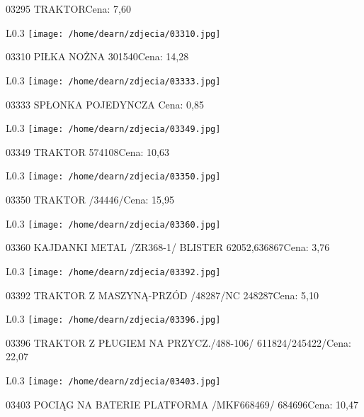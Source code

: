 03295 TRAKTORCena: 7,60\newline
\begin{wrapfigure}{L}{0.3\textwidth}
\texttt{[image: /home/dearn/zdjecia/03310.jpg]}
\end{wrapfigure}
03310 PIŁKA NOŻNA  301540Cena: 14,28\newline
\begin{wrapfigure}{L}{0.3\textwidth}
\texttt{[image: /home/dearn/zdjecia/03333.jpg]}
\end{wrapfigure}
03333 SPŁONKA POJEDYNCZA Cena: 0,85\newline
\begin{wrapfigure}{L}{0.3\textwidth}
\texttt{[image: /home/dearn/zdjecia/03349.jpg]}
\end{wrapfigure}
03349 TRAKTOR  574108Cena: 10,63\newline
\begin{wrapfigure}{L}{0.3\textwidth}
\texttt{[image: /home/dearn/zdjecia/03350.jpg]}
\end{wrapfigure}
03350 TRAKTOR /34446/Cena: 15,95\newline
\begin{wrapfigure}{L}{0.3\textwidth}
\texttt{[image: /home/dearn/zdjecia/03360.jpg]}
\end{wrapfigure}
03360 KAJDANKI METAL  /ZR368-1/  BLISTER        62052,636867Cena: 3,76\newline
\begin{wrapfigure}{L}{0.3\textwidth}
\texttt{[image: /home/dearn/zdjecia/03392.jpg]}
\end{wrapfigure}
03392 TRAKTOR Z MASZYNĄ-PRZÓD  /48287/NC              248287Cena: 5,10\newline
\begin{wrapfigure}{L}{0.3\textwidth}
\texttt{[image: /home/dearn/zdjecia/03396.jpg]}
\end{wrapfigure}
03396 TRAKTOR Z PŁUGIEM NA PRZYCZ./488-106/   611824/245422/Cena: 22,07\newline
\begin{wrapfigure}{L}{0.3\textwidth}
\texttt{[image: /home/dearn/zdjecia/03403.jpg]}
\end{wrapfigure}
03403 POCIĄG NA BATERIE PLATFORMA /MKF668469/         684696Cena: 10,47\newline

